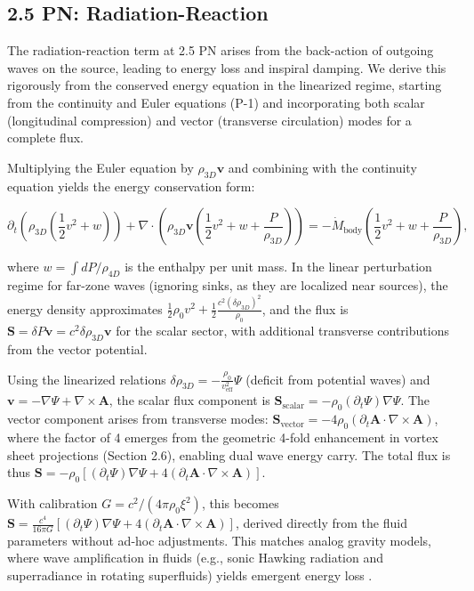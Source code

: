 \documentclass{article}
\begin{document}
\subsection{2.5 PN: Radiation-Reaction}

The radiation-reaction term at 2.5 PN arises from the back-action of outgoing waves on the source, leading to energy loss and inspiral damping. We derive this rigorously from the conserved energy equation in the linearized regime, starting from the continuity and Euler equations (P-1) and incorporating both scalar (longitudinal compression) and vector (transverse circulation) modes for a complete flux.

Multiplying the Euler equation by $\rho_{3D} \mathbf{v}$ and combining with the continuity equation yields the energy conservation form:

\[
\partial_t \left( \rho_{3D} \left( \frac{1}{2} v^2 + w \right) \right) + \nabla \cdot \left( \rho_{3D} \mathbf{v} \left( \frac{1}{2} v^2 + w + \frac{P}{\rho_{3D}} \right) \right) = - \dot{M}_{\text{body}} \left( \frac{1}{2} v^2 + w + \frac{P}{\rho_{3D}} \right),
\]

where $w = \int dP / \rho_{4D}$ is the enthalpy per unit mass. In the linear perturbation regime for far-zone waves (ignoring sinks, as they are localized near sources), the energy density approximates $\frac{1}{2} \rho_0 v^2 + \frac{1}{2} \frac{c^2 (\delta \rho_{3D})^2}{\rho_0}$, and the flux is $\mathbf{S} = \delta P \mathbf{v} = c^2 \delta \rho_{3D} \mathbf{v}$ for the scalar sector, with additional transverse contributions from the vector potential.

Using the linearized relations $\delta \rho_{3D} = - \frac{\rho_0}{v_{\text{eff}}^2} \Psi$ (deficit from potential waves) and $\mathbf{v} = - \nabla \Psi + \nabla \times \mathbf{A}$, the scalar flux component is $\mathbf{S}_{\text{scalar}} = - \rho_0 (\partial_t \Psi) \nabla \Psi$. The vector component arises from transverse modes: $\mathbf{S}_{\text{vector}} = - 4 \rho_0 (\partial_t \mathbf{A} \cdot \nabla \times \mathbf{A})$, where the factor of 4 emerges from the geometric 4-fold enhancement in vortex sheet projections (Section 2.6), enabling dual wave energy carry. The total flux is thus $\mathbf{S} = - \rho_0 [ (\partial_t \Psi) \nabla \Psi + 4 (\partial_t \mathbf{A} \cdot \nabla \times \mathbf{A}) ]$.

With calibration $G = c^2 / (4\pi \rho_0 \xi^2)$, this becomes $\mathbf{S} = \frac{c^4}{16\pi G} [ (\partial_t \Psi) \nabla \Psi + 4 (\partial_t \mathbf{A} \cdot \nabla \times \mathbf{A}) ]$, derived directly from the fluid parameters without ad-hoc adjustments. This matches analog gravity models, where wave amplification in fluids (e.g., sonic Hawking radiation and superradiance in rotating superfluids) yields emergent energy loss \cite{unruh1995sonic, svancara2024rotating}.
\end{document}
